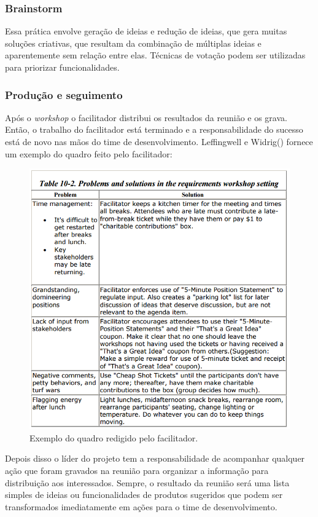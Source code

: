       \subsubsection{Brainstorm}
	
	Essa prática envolve geração de ideias e redução de ideias, que gera muitas soluções criativas, 
	que resultam da combinação de múltiplas ideias e aparentemente sem relação entre elas. 
	Técnicas de votação podem ser utilizadas para priorizar funcionalidades.
      
      \subsubsection{Produção e seguimento}
      
	Após o \textit{workshop} o facilitador distribui os resultados da reunião e os grava. 
	Então, o trabalho do facilitador está terminado e a responsabilidade do sucesso está de novo nas mãos do time de desenvolvimento. 
	Leffingwell e Widrig(\citeyear{leffingwell99}) fornece um exemplo do quadro feito pelo facilitador:
	
	\begin{figure}[!htbp]
	  \centering
	  \includegraphics[scale=0.5]{editaveis/figuras/problems_solutions}
	  \caption[Exemplo do quadro redigido pelo facilitador]
	    {Exemplo do quadro redigido pelo facilitador.\footnotemark}
	  \label{problems_solutions}
	\end{figure}
	Depois disso o líder do projeto tem a responsabilidade de acompanhar qualquer ação que foram gravados 
	na reunião para organizar a informação para distribuição aos interessados. 
	Sempre, o resultado da reunião será uma lista simples de ideias ou funcionalidades de produtos 
	sugeridos que podem ser transformados imediatamente em ações para o time de desenvolvimento.
      
      


    


 
    